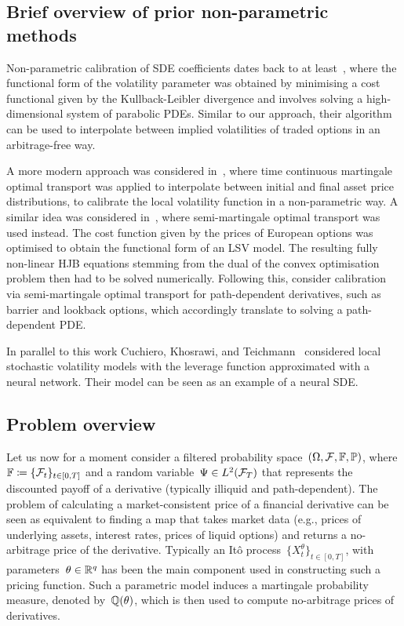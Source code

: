 \subsection{Brief overview of prior non-parametric methods}

Non-parametric calibration of SDE coefficients dates back to at least~\cite{Avellaneda1997CalibratingMinimization}, where the functional form of the volatility parameter was obtained by minimising a cost functional given by the Kullback-Leibler divergence and involves solving a high-dimensional system of parabolic PDEs. Similar to our approach, their algorithm can be used to interpolate between implied volatilities of traded options in an arbitrage-free way.

A more modern approach was considered in~\cite{Guo2017LocalTransport}, where time continuous martingale optimal transport was applied to interpolate between initial and final asset price distributions, to calibrate the local volatility function in a non-parametric way. 
A similar idea was considered in~\cite{Guo2022CalibrationTransport}, where semi-martingale optimal transport was used instead. 
The cost function given by the prices of European options was optimised to obtain the functional form of an LSV model. The resulting fully non-linear HJB equations stemming from the dual of the convex optimisation problem then had to be solved numerically. Following this, \cite{Guo2018PathDerivatives} consider calibration via semi-martingale optimal transport for path-dependent derivatives, such as barrier and lookback options, which accordingly translate to solving a path-dependent PDE.

In parallel to this work Cuchiero, Khosrawi, and Teichmann~\cite{Cuchiero2020AModels} considered local stochastic volatility models with the leverage function approximated with a neural network. Their model can be seen as an example of a neural SDE.

\subsection{Problem overview}\label{sec problem overview}

Let us now for a moment consider a filtered probability space~$(\Omega, \mathcal{F}, \mathbb{F},\mathbb{P})$, where ${\mathbb{F}\coloneqq \{\mathcal{F}_t\}_{t\in[0, T]}}$ and a random variable~$\Psi \in L^2(\mathcal{F}_T)$ that represents the discounted payoff of a derivative (typically illiquid and path-dependent). 
The problem of calculating a market-consistent price of a financial derivative can be seen as equivalent to finding a map that takes market data (e.g., prices of underlying assets, interest rates, prices of liquid options) and returns a no-arbitrage price of the derivative.
Typically an It\^{o} process~$\{X_t^\theta\}_{{t}\in[0, T]}$, with parameters~$\theta \in \mathbb{R}^q$ has been the main component used in constructing such a pricing function. 
Such a parametric model induces a martingale probability measure, denoted by~$\mathbb{Q}(\theta)$, which is then used to compute no-arbitrage prices of derivatives.

